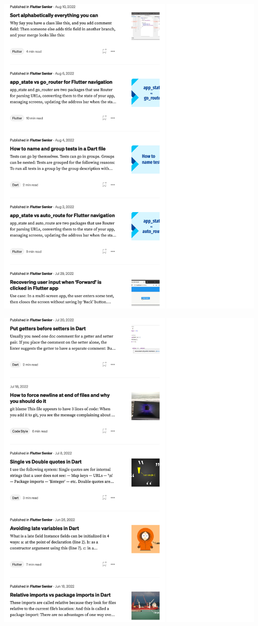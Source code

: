 \Continuing
\begin{center}
    \includegraphics[width=40em]{medium-articles-p9}
\end{center}
\WillContinue
\pagebreak

\Continuing
\begin{center}
    \includegraphics[width=40em]{medium-articles-p10}
\end{center}
\WillContinue
\pagebreak

